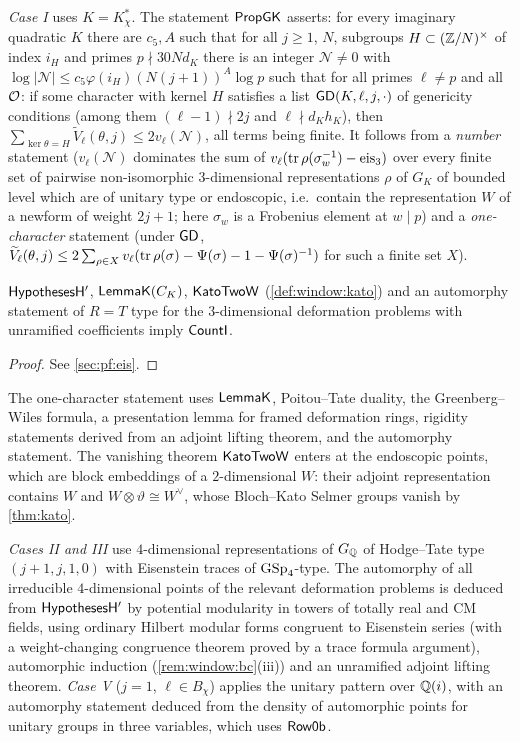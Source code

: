 \emph{Case I} uses $K=K^*_\chi$. The statement $\mathsf{PropGK}$ asserts: for every imaginary quadratic $K$ there are
$c_5,A$ such that for all $j\ge1$, $N$, subgroups $H\subset(\mathbb{Z}/N)^\times$ of index $i_H$ and primes $p\nmid30Nd_K$
there is an integer $\mathcal N\ne0$ with $\log|\mathcal N|\le c_5\varphi(i_H)(N(j+1))^A\log p$ such that for all
primes $\ell\ne p$ and all $\mathcal{O}$: if some character with kernel $H$ satisfies a list $\mathsf{GD}(K,\ell,j,\cdot)$ of
genericity conditions (among them $(\ell-1)\nmid2j$ and $\ell\nmid d_Kh_K$), then
$\sum_{\ker\theta=H}\widetilde V_\ell(\theta,j)\le2v_\ell(\mathcal N)$, all terms being finite. It follows from a
\emph{number} statement ($v_\ell(\mathcal N)$ dominates the sum of $v_\ell(\operatorname{tr}\rho(\sigma_w^{-1})-\mathrm{eis}_3)$ over every
finite set of pairwise non-isomorphic $3$-dimensional representations $\rho$ of $G_K$ of bounded level which are of
unitary type or endoscopic, i.e.\ contain the representation $W$ of a newform of weight $2j+1$; here $\sigma_w$ is
a Frobenius element at $w\mid p$) and a \emph{one-character} statement (under $\mathsf{GD}$,
$\widetilde V_\ell(\theta,j)\le2\sum_{\rho\in X}v_\ell(\operatorname{tr}\rho(\sigma)-\Psi(\sigma)-1-\Psi(\sigma)^{-1})$ for such a finite set
$X$).

\begin{theorem}[Case I]\Fmark\label{thm:window:countI}
$\mathsf{HypothesesH'}$, $\mathsf{LemmaK}(C_K)$, $\mathsf{KatoTwoW}$ (\cref{def:window:kato}) and an automorphy
statement of $R=T$ type for the $3$-dimensional deformation problems with unramified coefficients imply
$\mathsf{CountI}$.
\end{theorem}
\begin{proof}See \cref{sec:pf:eis}.
\end{proof}


The one-character statement uses $\mathsf{LemmaK}$, Poitou--Tate duality, the Greenberg--Wiles formula, a
presentation lemma for framed deformation rings, rigidity statements derived from an adjoint lifting theorem, and
the automorphy statement. The vanishing theorem $\mathsf{KatoTwoW}$ enters at the endoscopic points, which are
block embeddings of a $2$-dimensional $W$: their adjoint representation contains $W$ and
$W\otimes\vartheta\cong W^\vee$, whose Bloch--Kato Selmer groups vanish by \cref{thm:kato}.

\emph{Cases II and III} use $4$-dimensional representations of $G_{\mathbb{Q}}$ of Hodge--Tate type $(j+1,j,1,0)$ with
Eisenstein traces of $\operatorname{GSp}_4$-type. The automorphy of all irreducible $4$-dimensional points of the relevant
deformation problems is deduced from $\mathsf{HypothesesH'}$ by potential modularity in towers of totally real and CM
fields, using ordinary Hilbert modular forms congruent to Eisenstein series (with a weight-changing congruence
theorem proved by a trace formula argument), automorphic induction (\cref{rem:window:bc}(iii)) and an unramified
adjoint lifting theorem.
\emph{Case V} ($j=1$, $\ell\in B_\chi$) applies the unitary pattern over $\mathbb{Q}(i)$, with an automorphy statement deduced
from the density of automorphic points for unitary groups in three variables, which uses $\mathsf{Row0b}$.

